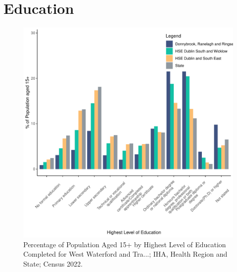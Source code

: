 \documentclass{article}
\begin{document}
\section{Education}\label{sect:Edu}
\begin{figure}[H]
	\centering
	\includegraphics[width = 120mm]{../figures/EduED.pdf}
	\caption{Percentage of Population Aged 15+ by Highest Level of Education Completed for West Waterford and Tra...; IHA, Health Region and State; Census 2022.}
	\label{fig:vbnv}
	\end{figure}
\end{document}
